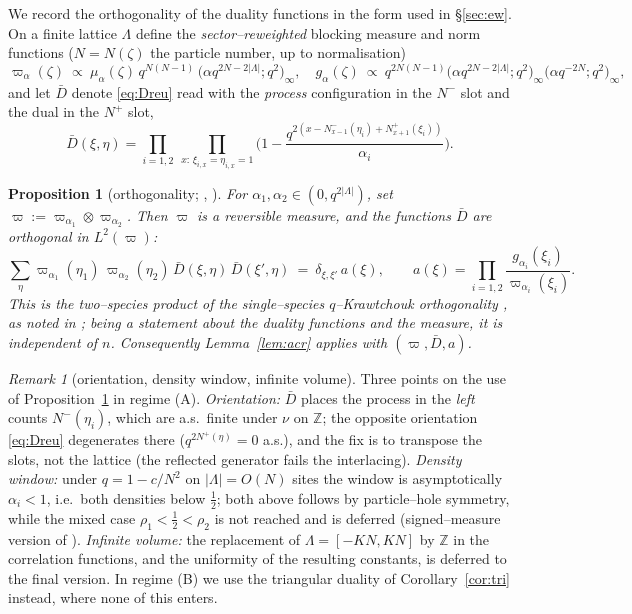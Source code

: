 \documentclass[11pt]{article}
\theoremstyle{plain}
\newtheorem{proposition}[theorem]{Proposition}
\theoremstyle{definition}
\theoremstyle{remark}
\newtheorem{remark}[theorem]{Remark}
\newcommand{\Z}{\mathbb{Z}}\newcommand{\R}{\mathbb{R}}\newcommand{\N}{\mathbb{N}}
\begin{document}
We record the orthogonality of the duality functions in the form used in
\S\ref{sec:ew}. On a finite lattice $\Lambda$ define the \emph{sector--reweighted}
blocking measure and norm functions ($N=N(\zeta)$ the particle number, up to
normalisation)
\begin{equation}\label{eq:omegadef}
  \varpi_\alpha(\zeta)\ \propto\ \mu_\alpha(\zeta)\,q^{N(N-1)}\,
  \big(\alpha q^{2N-2|\Lambda|};q^2\big)_\infty,\quad
  g_\alpha(\zeta)\ \propto\ q^{2N(N-1)}
  \big(\alpha q^{2N-2|\Lambda|};q^2\big)_\infty\big(\alpha q^{-2N};q^2\big)_\infty,
\end{equation}
and let $\bar D$ denote \eqref{eq:Dreu} read with the \emph{process} configuration in
the $N^-$ slot and the dual in the $N^+$ slot,
\[
  \bar D(\xi,\eta)=\prod_{i=1,2}\ \prod_{x:\,\xi_{i,x}=\eta_{i,x}=1}
  \Big(1-\frac{q^{2\left(x-N^-_{x-1}(\eta_i)+N^+_{x+1}(\xi_i)\right)}}{\alpha_i}\Big).
\]

\begin{proposition}[orthogonality; {\cite[Thm.~3.2]{CFG20}}, {\cite[\S3.1]{REU}}]
\label{prop:orth}
For $\alpha_1,\alpha_2\in(0,q^{2|\Lambda|})$, set
$\varpi:=\varpi_{\alpha_1}\otimes\varpi_{\alpha_2}$. Then $\varpi$ is a reversible
measure, and the functions $\bar D$ are orthogonal in $L^2(\varpi)$:
\begin{equation}\label{eq:orthexact}
  \sum_\eta \varpi_{\alpha_1}(\eta_1)\,\varpi_{\alpha_2}(\eta_2)\,
  \bar D(\xi,\eta)\,\bar D(\xi',\eta)\ =\ \delta_{\xi,\xi'}\,a(\xi),\qquad
  a(\xi)=\prod_{i=1,2}\frac{g_{\alpha_i}(\xi_i)}{\varpi_{\alpha_i}(\xi_i)}.
\end{equation}
This is the two--species product of the single--species $q$--Krawtchouk orthogonality
\cite[Thm.~3.2]{CFG20}, as noted in \cite[\S3.1]{REU}; being a statement about the
duality functions and the measure, it is independent of $n$. Consequently
Lemma~\ref{lem:acr} applies with $(\varpi,\bar D,a)$.
\end{proposition}

\begin{remark}[orientation, density window, infinite volume]\label{rem:orthstatus}
Three points on the use of Proposition~\ref{prop:orth} in regime (A). \emph{Orientation:}
$\bar D$ places the process in the \emph{left} counts $N^-(\eta_i)$, which are a.s.\
finite under $\nu$ on $\Z$; the opposite orientation \eqref{eq:Dreu} degenerates there
($q^{2N^+(\eta)}=0$ a.s.), and the fix is to transpose the slots, not the lattice (the
reflected generator fails the interlacing). \emph{Density window:} under $q=1-c/N^2$ on
$|\Lambda|=O(N)$ sites the window is asymptotically $\alpha_i<1$, i.e.\ both densities
below $\tfrac12$; both above follows by particle--hole symmetry, while the mixed case
$\rho_1<\tfrac12<\rho_2$ is not reached and is deferred (signed--measure version of
\cite[Thm.~3.2]{CFG20}). \emph{Infinite volume:} the replacement of $\Lambda=[-KN,KN]$
by $\Z$ in the correlation functions, and the uniformity of the resulting constants,
is deferred to the final version. In regime (B) we use the triangular duality of
Corollary~\ref{cor:tri} instead, where none of this enters.
\end{remark}
\end{document}
